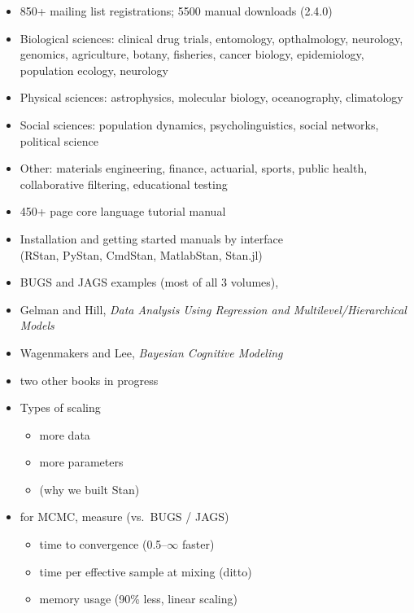 \documentclass[10pt]{report}
\newcommand{\sld}[1]{\newpage{\noindent\LARGE \ \ \
    \textcolor{MidnightBlue}{\bfseries #1}}\vspace*{4pt}}
\newcommand{\myemph}[1]{{\color{MidnightBlue}{\bfseries #1}}}
\begin{document}
\sld{Who's Using Stan?}
\begin{itemize}
\item 850+ mailing list registrations;  5500 manual downloads (2.4.0)

\item Biological sciences: {\footnotesize
clinical drug trials, entomology, opthalmology,
neurology, genomics, agriculture, botany, fisheries,
cancer biology, epidemiology, population ecology, neurology
}
\item Physical sciences: {\footnotesize 
astrophysics, molecular biology, oceanography, climatology
}
\item Social sciences: {\footnotesize
 population dynamics, psycholinguistics, social networks, political science
}
\item Other: {\footnotesize materials engineering, finance, actuarial,
  sports, public health,
  collaborative filtering, educational testing}
\end{itemize}

\sld{Books and Model Sets}
% 
\begin{itemize}
\item 450+ page core language tutorial manual
\item Installation and getting started manuals by interface
  \\ {\footnotesize  (RStan, PyStan, CmdStan, MatlabStan, Stan.jl)}
\item BUGS and JAGS examples (most of all 3 volumes), 
\item Gelman and Hill, {\slshape Data Analysis Using Regression and
    Multilevel/Hierarchical Models}
\item Wagenmakers and Lee, {\slshape Bayesian Cognitive Modeling}
\item two other books in progress
\end{itemize}

\sld{Scaling and Evaluation}
\begin{itemize}
\item Types of scaling
  \vspace*{-4pt}
  \begin{itemize}\small
  \item more data
  \item more parameters
  \item \myemph{more complex models} \hfill (why we built Stan)
  \end{itemize}
\item for MCMC, measure \hfill (vs.\ BUGS / JAGS)
  \vspace*{-4pt}
  \begin{itemize}\small
  \item time to convergence \hfill (0.5--{\large$\infty$} faster)
  \item time per effective sample at mixing \hfill (ditto)
  \item memory usage \hfill (90\% less, linear scaling)
  \end{itemize}
\end{itemize}
\end{document}
